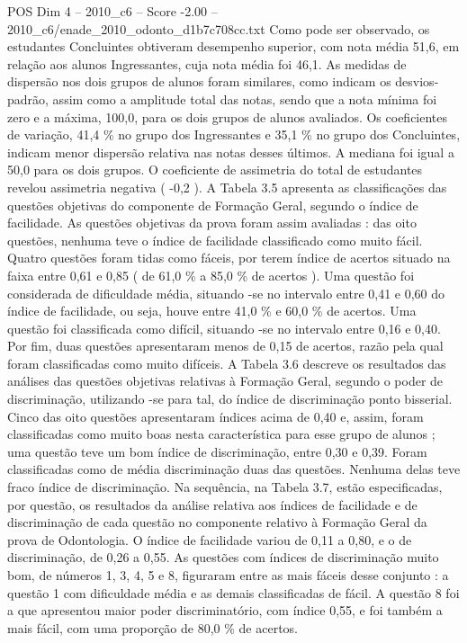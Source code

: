 \begin{textsample}{POS Dim 4 – 2010\_c6 – Score -2.00 – 2010\_c6/enade\_2010\_odonto\_d1b7c708cc.txt}
Como pode ser observado, os estudantes Concluintes obtiveram desempenho superior, com nota média 51,6, em relação aos alunos Ingressantes, cuja nota média foi 46,1.
As medidas de dispersão nos dois grupos de alunos foram similares, como indicam os desvios-padrão, assim como a amplitude total das notas, sendo que a nota mínima foi zero e a máxima, 100,0, para os dois grupos de alunos avaliados.
Os coeficientes de variação, 41,4 \% no grupo dos Ingressantes e 35,1 \% no grupo dos Concluintes, indicam menor dispersão relativa nas notas desses últimos.
A mediana foi igual a 50,0 para os dois grupos.
O coeficiente de assimetria do total de estudantes revelou assimetria negativa ( -0,2 ).
A Tabela 3.5 apresenta as classificações das questões objetivas do componente de Formação Geral, segundo o índice de facilidade.
As questões objetivas da prova foram assim avaliadas : das oito questões, nenhuma teve o índice de facilidade classificado como muito fácil.
Quatro questões foram tidas como fáceis, por terem índice de acertos situado na faixa entre 0,61 e 0,85 ( de 61,0 \% a 85,0 \% de acertos ).
Uma questão foi considerada de dificuldade média, situando -se no intervalo entre 0,41 e 0,60 do índice de facilidade, ou seja, houve entre 41,0 \% e 60,0 \% de acertos.
Uma questão foi classificada como difícil, situando -se no intervalo entre 0,16 e 0,40.
Por fim, duas questões apresentaram menos de 0,15 de acertos, razão pela qual foram classificadas como muito difíceis.
A Tabela 3.6 descreve os resultados das análises das questões objetivas relativas à Formação Geral, segundo o poder de discriminação, utilizando -se para tal, do índice de discriminação ponto bisserial.
Cinco das oito questões apresentaram índices acima de 0,40 e, assim, foram classificadas como muito boas nesta característica para esse grupo de alunos ; uma questão teve um bom índice de discriminação, entre 0,30 e 0,39.
Foram classificadas como de média discriminação duas das questões.
Nenhuma delas teve fraco índice de discriminação.
Na sequência, na Tabela 3.7, estão especificadas, por questão, os resultados da análise relativa aos índices de facilidade e de discriminação de cada questão no componente relativo à Formação Geral da prova de Odontologia.
O índice de facilidade variou de 0,11 a 0,80, e o de discriminação, de 0,26 a 0,55.
As questões com índices de discriminação muito bom, de números 1, 3, 4, 5 e 8, figuraram entre as mais fáceis desse conjunto : a questão 1 com dificuldade média e as demais classificadas de fácil.
A questão 8 foi a que apresentou maior poder discriminatório, com índice 0,55, e foi também a mais fácil, com uma proporção de 80,0 \% de acertos.

\end{textsample}

